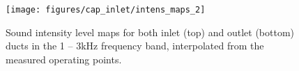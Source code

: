 \begin{figure}[b!]
\centering
\texttt{[image: figures/cap\_inlet/intens\_maps\_2]}
\caption{Sound intensity level maps for both inlet (top) and outlet (bottom) ducts in the 1 -- 3kHz frequency band, interpolated from the measured operating points.}
\label{fig:intens_maps}
\end{figure}






